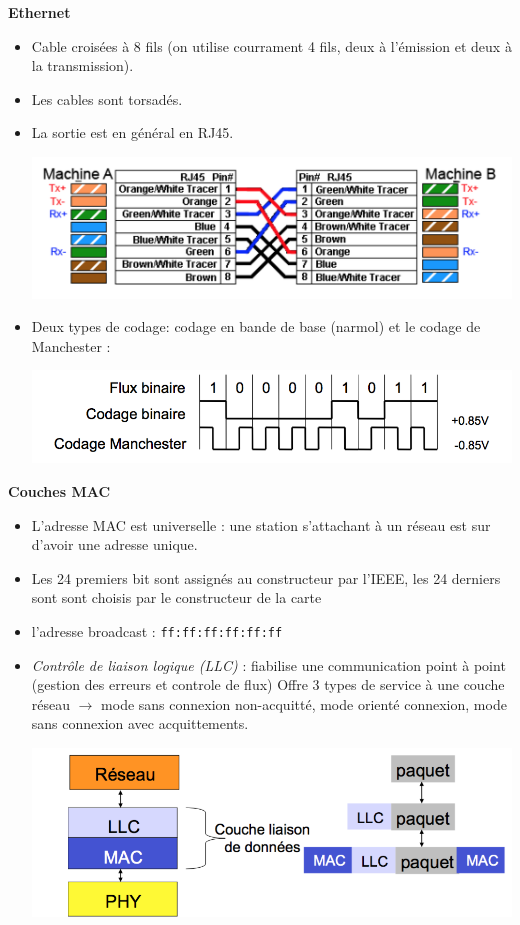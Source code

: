 \documentclass[a4paper,9pt, twocolumn]{article}
\begin{document}
\textbf{Ethernet}
\begin{itemize}
\item Cable croisées à 8 fils (on utilise courrament 4 fils, deux à l'émission et deux à la transmission).
\item Les cables sont torsadés.
\item La sortie est en général en RJ45.

\includegraphics[scale=0.4]{RJ.png}

\item Deux types de codage: codage en bande de base (narmol) et le codage de Manchester : 

\includegraphics[scale=0.4]{code.png}
\end{itemize}
\textbf{Couches MAC}
\begin{itemize}
\item L'adresse MAC est universelle : une station s'attachant à un réseau est sur d'avoir une adresse unique. 
\item Les 24 premiers bit sont assignés au constructeur par l'IEEE, les 24 derniers sont sont choisis par le constructeur de la carte
\item l'adresse broadcast : \texttt{ff:ff:ff:ff:ff:ff}
\item \textit{Contrôle de liaison logique (LLC)} : fiabilise une communication point à point (gestion des erreurs et controle de flux) Offre 3 types de service à une couche réseau $\longrightarrow$ mode sans connexion non-acquitté, mode orienté connexion, mode sans connexion avec acquittements.

\includegraphics[scale=0.4]{LLC.png}

\end{itemize}
\end{document}
